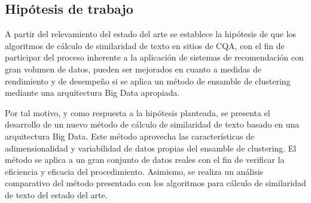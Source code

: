 \subsection{Hipótesis de trabajo}
A partir del relevamiento del estado del arte se establece la hipótesis de que los algoritmos de cálculo de similaridad de texto en sitios de CQA, con el fin de participar del proceso inherente a la aplicación de sistemas de recomendación con gran volumen de datos, pueden ser mejorados en cuanto a medidas de rendimiento y de desempeño si se aplica un método de ensamble de clustering mediante una arquitectura Big Data apropiada.

\bigskip Por tal motivo, y como respuesta a la hipótesis planteada, se presenta el desarrollo de un nuevo método de cálculo de similaridad de texto basado en una arquitectura Big Data. Este método aprovecha las características de adimensionalidad y variabilidad de datos propias del ensamble de clustering. El método se aplica a un gran conjunto de datos reales con el fin de verificar la eficiencia y eficacia del procedimiento. Asimismo, se realiza un análisis comparativo del método presentado con los algoritmos para cálculo de similaridad de texto del estado del arte.